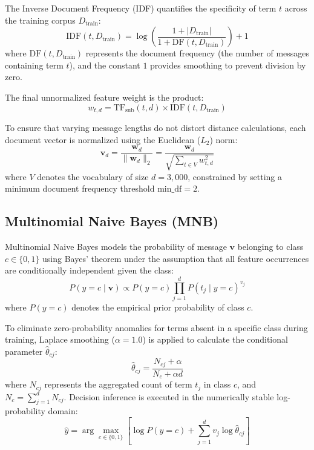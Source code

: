 \documentclass[conference]{IEEEtran}
\begin{document}
The Inverse Document Frequency (IDF) quantifies the specificity of term $t$ across the training corpus $D_{\text{train}}$:
\begin{equation}
\text{IDF}(t, D_{\text{train}}) = \log \left( \frac{1 + |D_{\text{train}}|}{1 + \text{DF}(t, D_{\text{train}})} \right) + 1
\end{equation}
where $\text{DF}(t, D_{\text{train}})$ represents the document frequency (the number of messages containing term $t$), and the constant $1$ provides smoothing to prevent division by zero.

The final unnormalized feature weight is the product:
\begin{equation}
w_{t, d} = \text{TF}_{\text{sub}}(t, d) \times \text{IDF}(t, D_{\text{train}})
\end{equation}

To ensure that varying message lengths do not distort distance calculations, each document vector is normalized using the Euclidean ($L_2$) norm:
\begin{equation}
\mathbf{v}_d = \frac{\mathbf{w}_d}{\|\mathbf{w}_d\|_2} = \frac{\mathbf{w}_d}{\sqrt{\sum_{t \in V} w_{t, d}^2}}
\end{equation}
where $V$ denotes the vocabulary of size $d = 3,000$, constrained by setting a minimum document frequency threshold $\text{min\_df} = 2$.

\subsection{Multinomial Naive Bayes (MNB)}
Multinomial Naive Bayes models the probability of message $\mathbf{v}$ belonging to class $c \in \{0, 1\}$ using Bayes' theorem under the assumption that all feature occurrences are conditionally independent given the class:
\begin{equation}
P(y = c \mid \mathbf{v}) \propto P(y = c) \prod_{j=1}^{d} P(t_j \mid y = c)^{v_j}
\end{equation}
where $P(y = c)$ denotes the empirical prior probability of class $c$.

To eliminate zero-probability anomalies for terms absent in a specific class during training, Laplace smoothing ($\alpha = 1.0$) is applied to calculate the conditional parameter $\hat{\theta}_{cj}$:
\begin{equation}
\hat{\theta}_{cj} = \frac{N_{cj} + \alpha}{N_c + \alpha d}
\end{equation}
where $N_{cj}$ represents the aggregated count of term $t_j$ in class $c$, and $N_c = \sum_{j=1}^d N_{cj}$. Decision inference is executed in the numerically stable log-probability domain:
\begin{equation}
\hat{y} = \arg\max_{c \in \{0, 1\}} \left[ \log P(y = c) + \sum_{j=1}^{d} v_j \log \hat{\theta}_{cj} \right]
\end{equation}
\end{document}
